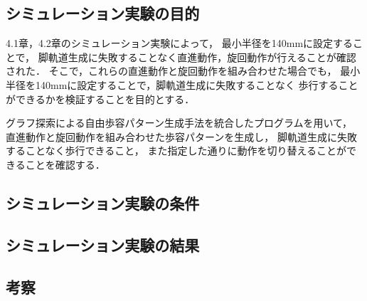 
\subsection{シミュレーション実験の目的}
4.1章，4.2章のシミュレーション実験によって，
最小半径を140mmに設定することで，
脚軌道生成に失敗することなく直進動作，旋回動作が行えることが確認された．
そこで，これらの直進動作と旋回動作を組み合わせた場合でも，
最小半径を140mmに設定することで，脚軌道生成に失敗することなく
歩行することができるかを検証することを目的とする．

グラフ探索による自由歩容パターン生成手法を統合したプログラムを用いて，
直進動作と旋回動作を組み合わせた歩容パターンを生成し，
脚軌道生成に失敗することなく歩行できること，
また指定した通りに動作を切り替えることができることを確認する．

\subsection{シミュレーション実験の条件}

\subsection{シミュレーション実験の結果}

\subsection{考察}
